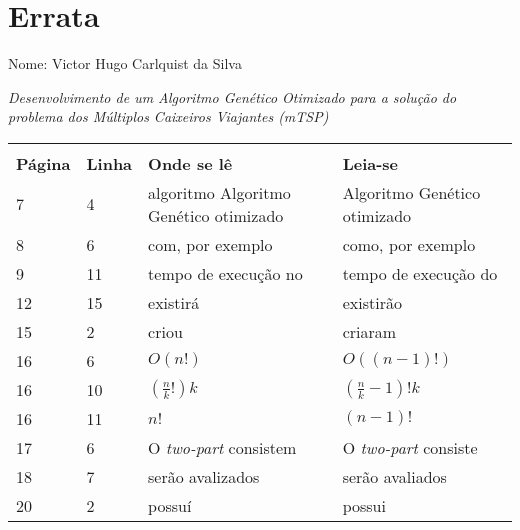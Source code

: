\documentclass{abnt}
\begin{document}
	
	\chapter*{Errata}
	Nome: Victor Hugo Carlquist da Silva

	\textit{Desenvolvimento de um Algoritmo Genético Otimizado para a solução do problema dos Múltiplos Caixeiros Viajantes (\textit{mTSP})}
	\begin{table}[!ht]
	  \centering 
		\begin{tabular}{m{2cm} m{2cm} m{4cm} m{4cm}} \hline \\ 
		\textbf{Página} 	& \textbf{Linha} & \textbf{Onde se lê} & \textbf{Leia-se} \\ \hline
			7 		&   4   & algoritmo Algoritmo Genético otimizado & Algoritmo Genético otimizado \\ \hline
			8		&   6	& com, por exemplo & como, por exemplo \\ \hline
			9		&   11	& tempo de execução no & tempo de execução do \\ \hline
			12 		&   15   & existirá & existirão \\ \hline
			15	&   2   & criou & criaram \\ \hline
			16	&   6   & $O(n!)$ & $O((n-1)!)$ \\ \hline
			16  & 	10  & $(\frac{n}{k}!)k$ & $(\frac{n}{k}-1)!k$ \\ \hline
			16  & 	11  & $n!$ & $(n-1)!$ \\ \hline
			17  & 	6  & O \textit{two-part} consistem & O \textit{two-part} consiste \\ \hline
			18  & 	7  & serão avalizados & serão avaliados \\ \hline
			20  & 	2  & possuí & possui \\ \hline
		\end{tabular}
	\end{table}
\end{document}
